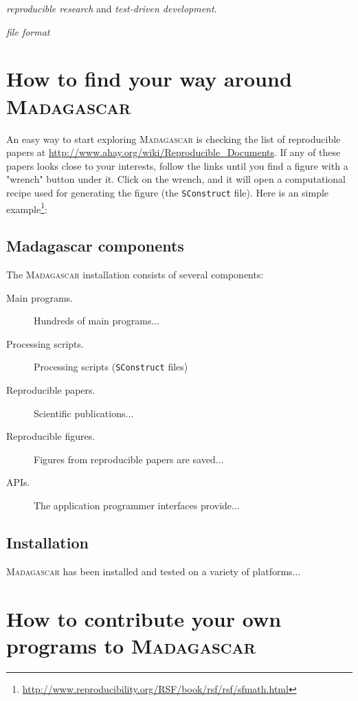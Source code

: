 \emph{reproducible research} and \emph{test-driven development}.

\emph{file format} 

\section{How to find your way around \textsc{Madagascar}}

An easy way to start exploring \textsc{Madagascar} is checking the
list of reproducible papers at
\url{http://www.ahay.org/wiki/Reproducible_Documents}.  If any of
these papers looks close to your interests, follow the links until you
find a figure with a "wrench" button under it. Click on the wrench,
and it will open a computational recipe used for generating the figure
(the \texttt{SConstruct} file). Here is an simple
example\footnote{\url{http://www.reproducibility.org/RSF/book/rsf/rsf/sfmath.html}}:

\subsection{Madagascar components}

The \textsc{Madagascar} installation consists of several components:
\begin{description}
\item[Main programs.] Hundreds of main programs...
\item[Processing scripts.] Processing scripts (\texttt{SConstruct} files)
\item[Reproducible papers.] Scientific publications...
\item[Reproducible figures.] Figures from reproducible papers are saved...
\item[APIs.] The application programmer interfaces provide...  
\end{description}

\subsection{Installation}

\textsc{Madagascar} has been installed and tested on a variety of platforms...

\section{How to contribute your own programs to \textsc{Madagascar}}

